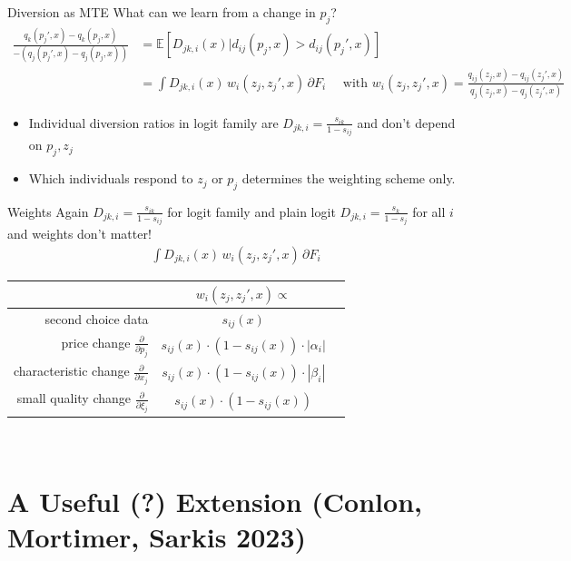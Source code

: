 \documentclass[aspectratio=169,10pt]{beamer}
\begin{document}
\begin{frame}{Diversion as MTE}
\footnotesize
What can we learn from a change in $p_j$?
\begin{align*}
 \frac{q_k(p_j',x) - q_k(p_j,x)}{-\left(q_j(p_j',x) - q_j(p_j,x)\right)}&=\mathbb{E}[D_{jk,i}(x) | d_{ij}(p_j,x) > d_{ij}(p_j',x)]\\
&= \int D_{jk,i}(x) \, w_i(z_j,z_j',x)  \, \partial F_i \quad \mbox{ with } w_i(z_j,z_j',x) = \frac{q_{ij}(z_j,x)- q_{ij}(z_j',x) }{q_j(z_j,x)- q_j(z_j',x)}
\end{align*}
\begin{itemize}
\item Individual diversion ratios in logit family are $D_{jk,i} = \frac{s_{ik}}{1-s_{ij}}$ and don't depend on $p_j,z_j$
\item Which individuals respond to $z_j$ or $p_j$ determines the weighting scheme only.
\end{itemize}
\end{frame}

\begin{frame}{Weights}
Again $D_{jk,i} = \frac{s_{ik}}{1-s_{ij}}$ for logit family and plain logit $D_{jk,i} = \frac{s_{k}}{1-s_{j}}$ for all $i$ and weights don't matter!
\begin{align*}
\int D_{jk,i}(x) \, w_i(z_j,z_j',x)  \, \partial F_i 
\end{align*}
\begin{center}
\begin{tabular}{rcc} 
& $w_i(z_j,z_j',x) \propto$ \\
\midrule second choice data & $s_{i j}(x)$ \\
price change $\frac{\partial}{\partial p_{j}}$ & $s_{i j}(x) \cdot\left(1-s_{i j}(x)\right) \cdot\left|\alpha_{i}\right|$ \\
characteristic change $\frac{\partial}{\partial x_{j}}$ & $s_{i j}(x) \cdot\left(1-s_{i j}(x)\right) \cdot\left|\beta_{i}\right|$ \\
small quality change $\frac{\partial}{\partial \xi_{j}}$ & $s_{i j}(x) \cdot\left(1-s_{i j}(x)\right)$ \\
\midrule
\end{tabular}\\
\end{center}
\end{frame}

\section{A Useful (?) Extension (Conlon, Mortimer, Sarkis 2023)}
\end{document}
